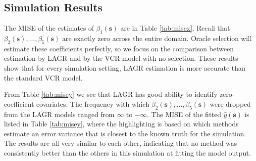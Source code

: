 \documentclass[12pt,english,authoryear, review]{article}\usepackage[]{graphicx}\usepackage[]{color}
\makeatletter
\newenvironment{kframe}{%
 \def\at@end@of@kframe{}%
 \ifinner\ifhmode%
  \def\at@end@of@kframe{\end{minipage}}%
  \begin{minipage}{\columnwidth}%
 \fi\fi%
 \def\FrameCommand##1{\hskip\@totalleftmargin \hskip-\fboxsep
 \colorbox{shadecolor}{##1}\hskip-\fboxsep
     \hskip-\linewidth \hskip-\@totalleftmargin \hskip\columnwidth}%
 \MakeFramed {\advance\hsize-\width
   \@totalleftmargin\z@ \linewidth\hsize
   \@setminipage}}%
 {\par\unskip\endMakeFramed%
 \at@end@of@kframe}
\theoremstyle{plain}
\theoremstyle{plain}
\makeatother
\begin{document}
\subsection{Simulation Results}

The MISE of the estimates of $\beta_{1}(\bm{s})$ are in Table \ref{tab:misex}.
Recall that $\beta_{2}(\bm{s}),\dots,\beta_{5}(\bm{s})$ are exactly
zero across the entire domain. Oracle selection will estimate these
coefficients perfectly, so we focus on the comparison between estimation
by LAGR and by the VCR model with no selection. These results show
that for every simulation setting, LAGR estimation is more accurate
than the standard VCR model.

\begin{kframe}


{\ttfamily\noindent\color{warningcolor}{\#\# Warning: cannot open compressed file '/Users/wesley/scratch/gwr-sim-output.RData', probable reason 'No such file or directory'}}

{\ttfamily\noindent\bfseries\color{errorcolor}{\#\# Error: cannot open the connection}}

{\ttfamily\noindent\bfseries\color{errorcolor}{\#\# Error: object 'pzero' not found}}\end{kframe}

From Table \ref{tab:misey} we see that LAGR has good ability to identify
zero-coefficient covariates. The frequency with which $\beta_{2}(\bm{s}),\dots,\beta_{5}(\bm{s})$
were dropped from the LAGR models ranged from \ensuremath{\infty{}}
to \ensuremath{-\infty{}}. The MISE of the fitted $\hat{y}(\bm{s})$
is listed in Table \ref{tab:misey}, where the highlighting is based
on which methods estimate an error variance that is closest to the
known truth for the simulation. The results are all very similar to
each other, indicating that no method was consistently better than
the others in this simulation at fitting the model output.
\end{document}
